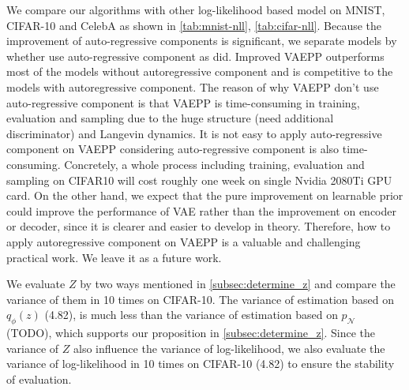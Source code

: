 We compare our algorithms with other log-likelihood based model on MNIST, CIFAR-10 and CelebA as shown in \cref{tab:mnist-nll}, \cref{tab:cifar-nll}. Because the improvement of auto-regressive components is significant, we separate models by whether use auto-regressive component as \cite{maaloe2019biva} did. Improved VAEPP outperforms most of the models without autoregressive component and is competitive to the models with autoregressive component. The reason of why VAEPP don't use auto-regressive component is that VAEPP is time-consuming in training,  evaluation and sampling due to the huge structure (need additional discriminator) and Langevin dynamics. It is not easy to apply auto-regressive component on VAEPP considering auto-regressive component is also time-consuming. Concretely, a whole process including training, evaluation and sampling on CIFAR10 will cost roughly one week on single Nvidia 2080Ti GPU card. On the other hand, we expect that the pure improvement on learnable prior could improve the performance of VAE rather than the improvement on encoder or decoder, since it is clearer and easier to develop in theory. Therefore, how to apply autoregressive component on VAEPP is a valuable and challenging practical work. We leave it as a future work.

We evaluate $Z$ by two ways mentioned in \cref{subsec:determine_z} and compare the variance of them in 10 times on CIFAR-10. The variance of estimation based on $q_\phi(z)$ (4.82), is much less than the variance of estimation based on $p_\mathcal{N}$ (TODO), which supports our proposition in \cref{subsec:determine_z}. Since the variance of $Z$ also influence the variance of log-likelihood, we also evaluate the variance of log-likelihood in 10 times on CIFAR-10 (4.82) to ensure the stability of evaluation. 

